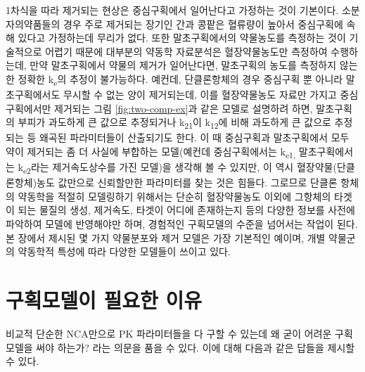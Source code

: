 \documentclass[
  11pt,
  krantz2, a4paper, twoside]{krantz}
\theoremstyle{definition}
\theoremstyle{definition}
\theoremstyle{definition}
\theoremstyle{definition}
\theoremstyle{remark}
\begin{document}
1차식을 따라 제거되는 현상은 중심구획에서 일어난다고 가정하는 것이
기본이다. 소분자의약품들의 경우 주로 제거되는 장기인 간과 콩팥은
혈류량이 높아서 중심구획에 속해 있다고 가정하는데 무리가 없다. 또한
말초구획에서의 약물농도를 측정하는 것이 기술적으로 어렵기 때문에
대부분의 약동학 자료분석은 혈장약물농도만 측정하여 수행하는데, 만약
말초구획에서 약물의 제거가 일어난다면, 말초구획의 농도를 측정하지 않는
한 정확한 k\textsubscript{e}의 추정이 불가능하다. 예컨데, 단클론항체의 경우 중심구획
뿐 아니라 말초구획에서도 무시할 수 없는 양이 제거되는데, 이를
혈장약물농도 자료만 가지고 중심구획에서만 제거되는 그림 \ref{fig:two-comp-ex}과 같은
모델로 설명하려 하면, 말초구획의 부피가 과도하게 큰 값으로 추정되거나
k\textsubscript{21}이 k\textsubscript{12}에 비해 과도하게 큰 값으로 추정되는 등 왜곡된 파라미터들이
산출되기도 한다. 이 때 중심구획과 말초구획에서 모두 약이 제거되는 좀 더
사실에 부합하는 모델(예컨데 중심구획에서는 k\textsubscript{e1,} 말초구획에서는
k\textsubscript{e2}라는 제거속도상수를 가진 모델)을 생각해 볼 수 있지만, 이 역시 혈장약물(단클론항체)농도 값만으로 신뢰할만한 파라미터를 찾는 것은 힘들다.
그로므로 단클론 항체의 약동학을 적절히 모델링하기 위해서는 단순히 혈장약물농도 이외에 그항체의 타겟이 되는 물질의 생성, 제거속도, 타겟이 어디에 존재하는지 등의 다양한 정보를 사전에 파악하여 모델에 반영해야만 하며, 경험적인 구획모델의 수준을 넘어서는 작업이 된다.
본 장에서 제시된 몇 가지 약물분포와 제거 모델은 가장 기본적인 예이며, 개별 약물군의 약동학적 특성에 따라 다양한 모델들이 쓰이고 있다.

\hypertarget{uxad6cuxd68duxbaa8uxb378uxc774-uxd544uxc694uxd55c-uxc774uxc720}{%
\section{구획모델이 필요한 이유}\label{uxad6cuxd68duxbaa8uxb378uxc774-uxd544uxc694uxd55c-uxc774uxc720}}

비교적 단순한 NCA만으로 PK 파라미터들을 다 구할 수 있는데 왜 굳이 어려운 구획모델을 써야 하는가? 라는 의문을 품을 수 있다.
이에 대해 다음과 같은 답들을 제시할 수 있다.
\end{document}
